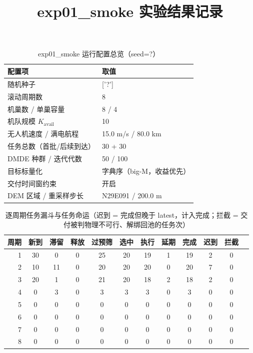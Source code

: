 \documentclass[a4paper,11pt]{article}
\begin{document}
\title{exp01\_smoke 实验结果记录}

\maketitle

\begin{table}[htbp]\centering
\caption{exp01\_smoke 运行配置总览（seed=?）}
\label{tab:exp01-config}
\begin{tabular}{ll}
\toprule
配置项 & 取值 \\
\midrule
随机种子 & ['?'] \\
滚动周期数 & 8 \\
机巢数 / 单巢容量 & 8 / 4 \\
机队规模 $K_{\mathrm{avail}}$ & 10 \\
无人机速度 / 满电航程 & 15.0 m/s / 80.0 km \\
任务总数（首批/后续到达） & 30 + 30 \\
DMDE 种群 / 迭代代数 & 50 / 100 \\
目标标量化 & 字典序（big-M，收益优先） \\
交付时间窗约束 & 开启 \\
DEM 区域 / 重采样步长 & N29E091 / 200.0 m \\
\bottomrule
\end{tabular}
\end{table}


\begin{table}[htbp]\centering
\caption{逐周期任务漏斗与任务命运（迟到 = 完成但晚于 latest，计入完成；拦截 = 交付被判物理不可行、解绑回池的任务次）}
\label{tab:exp01-funnel}
\begin{tabular}{rccccccccccc}
\toprule
周期 & 新到 & 滞留 & 释放 & 过预筛 & 选中 & 执行 & 延期 & 完成 & 迟到 & 拦截 \\
\midrule
1 & 30 & 0 & 0 & 25 & 20 & 19 & 1 & 19 & 2 & 0 \\
2 & 10 & 11 & 0 & 20 & 20 & 20 & 0 & 20 & 7 & 0 \\
3 & 20 & 1 & 0 & 21 & 20 & 18 & 2 & 18 & 2 & 0 \\
4 & 0 & 3 & 0 & 3 & 3 & 3 & 0 & 3 & 0 & 0 \\
5 & 0 & 0 & 0 & 0 & 0 & 0 & 0 & 0 & 0 & 0 \\
6 & 0 & 0 & 0 & 0 & 0 & 0 & 0 & 0 & 0 & 0 \\
7 & 0 & 0 & 0 & 0 & 0 & 0 & 0 & 0 & 0 & 0 \\
8 & 0 & 0 & 0 & 0 & 0 & 0 & 0 & 0 & 0 & 0 \\
\bottomrule
\end{tabular}
\end{table}
\end{document}

